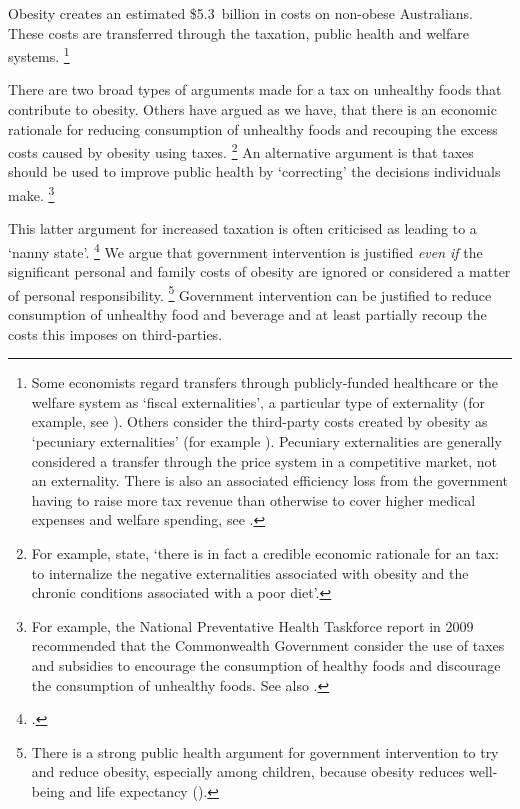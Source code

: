 \documentclass[embargoed]{grattan}
\begin{document}
Obesity creates an estimated \$5.3~billion in costs on non-obese Australians.
These costs are transferred through the taxation, public health and welfare systems.%
\footnote{Some economists regard transfers through publicly-funded healthcare or the welfare system as `fiscal externalities', a particular type of externality (for example, see \mbox{\textcite{Browning1999mythfiscalexternalities}}).
Others consider the third-party costs created by obesity as `pecuniary externalities' (for example \textcite{Commission2010ChildhoodObesityEconomic}).
Pecuniary externalities are generally considered a transfer through the price system in a competitive market, not an externality.
There is also an associated efficiency loss from the government having to raise more tax revenue than otherwise to cover higher medical expenses and welfare spending, see \textcite{Daley2015Propertytaxes}.}

There are two broad types of arguments made for a tax on unhealthy foods that contribute to obesity.
Others have argued as we have, that there is an economic rationale for reducing consumption of unhealthy foods and recouping the excess costs caused by obesity using taxes.%
\footnote{For example, \textcites{Veerman2016ImpactTaxSugar}{Karnani2016ObesityCrisisas}{Cawley2012medicalcarecosts}{Parks2012MarginalExternalCost} \textcite{Cawley2015IncidenceTaxesSugar} state, `there is in fact a credible economic rationale for an \SSB{} tax: to internalize the negative externalities associated with obesity and the chronic conditions associated with a poor diet'.} %
An alternative argument is that taxes should be used to improve public health by `correcting' the decisions individuals make.%
\footnote{For example, the National Preventative Health Taskforce report in 2009 recommended that the Commonwealth Government consider the use of taxes and subsidies to encourage the consumption of healthy foods and discourage the consumption of unhealthy foods.
See also \textcites{Powell2013Assessingpotentialeffectiveness}{Organisation2015Usingpricepolicies}{Thow2014systematicrevieweffectiveness}{Sassi2013rolefiscalpolicies}.}

This latter argument for increased taxation is often criticised as leading to a `nanny state'.%
\footcites{Novak2012Nannystatetaxes}{Keane2016Sugarohhoney}{Lesh2016Greenssoftdrinks}{Elliott2016TomElliottsays} We argue that government intervention is justified \emph{even if} the significant personal and family costs of obesity are ignored or considered a matter of personal responsibility.%
\footnote{There is a strong public health argument for government intervention to try and reduce obesity, especially among children, because obesity reduces well-being and life expectancy (\textcites{Roberto2015Patchyprogressobesity}{Waters2011Interventionspreventingobesity}{Ewart-Pierce2016WholeCommunityObesity}).} Government intervention can be justified to reduce consumption of unhealthy food and beverage and at least partially recoup the costs this imposes on third-parties.
\end{document}
